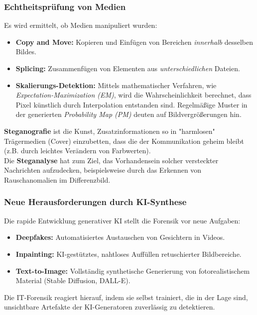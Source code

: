 \documentclass[
../../css_summary.tex,
]{subfiles}
\begin{document}
\subsubsection{Echtheitsprüfung von Medien}
Es wird ermittelt, ob Medien manipuliert wurden:
\begin{itemize}
  \item \textbf{Copy and Move:} Kopieren und Einfügen von Bereichen \textit{innerhalb} desselben Bildes.
  \item \textbf{Splicing:} Zusammenfügen von Elementen aus \textit{unterschiedlichen} Dateien.
  \item \textbf{Skalierungs-Detektion:} Mittels mathematischer Verfahren, wie \textit{Expectation-Maximization (EM)}, wird die Wahrscheinlichkeit berechnet, dass Pixel künstlich durch Interpolation entstanden sind. Regelmäßige Muster in der generierten \textit{Probability Map (PM)} deuten auf Bildvergrößerungen hin.
\end{itemize}

\begin{defbox}
  \textbf{Steganografie} ist die Kunst, Zusatzinformationen so in "harmlosen" Trägermedien (Cover) einzubetten, dass die  der Kommunikation geheim bleibt (z.B. durch leichtes Verändern von Farbwerten).
  \\
  Die \textbf{Steganalyse} hat zum Ziel, das Vorhandensein solcher versteckter Nachrichten aufzudecken, beispielsweise durch das Erkennen von Rauschanomalien im Differenzbild.
\end{defbox}

\subsubsection{Neue Herausforderungen durch KI-Synthese}
Die rapide Entwicklung generativer KI stellt die Forensik vor neue Aufgaben:
\begin{itemize}
  \item \textbf{Deepfakes:} Automatisiertes Austauschen von Gesichtern in Videos.
  \item \textbf{Inpainting:} KI-gestütztes, nahtloses Auffüllen retuschierter Bildbereiche.
  \item \textbf{Text-to-Image:} Vollständig synthetische Generierung von fotorealistischem Material (Stable Diffusion, DALL-E).
\end{itemize}
Die IT-Forensik reagiert hierauf, indem sie selbst  trainiert, die in der Lage sind, unsichtbare Artefakte der KI-Generatoren zuverlässig zu detektieren.
\end{document}
